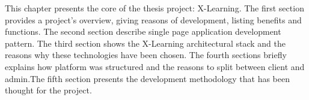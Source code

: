 This chapter presents the core of the thesis project: X-Learning.
The first section provides a project’s overview, giving reasons of development, listing benefits and functions. The second section describe single page application development pattern. The third section shows the X-Learning architectural stack and the reasons why these technologies have been chosen. {\color{red} The fourth sections briefly explains how platform was structured and the reasons to split between client and admin}.The fifth section presents the development methodology that has been thought for the project.